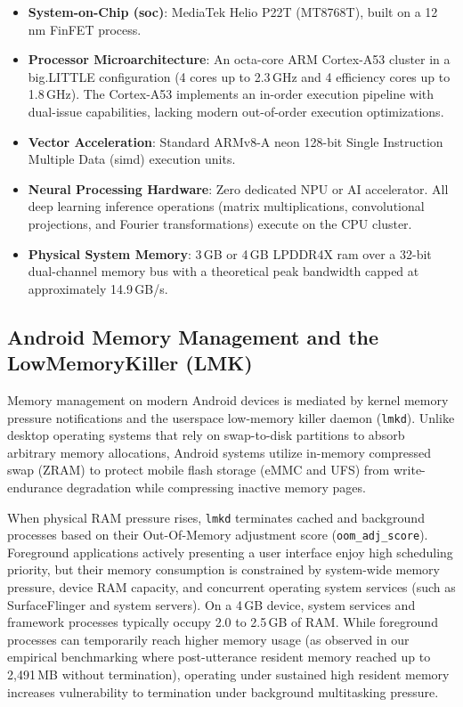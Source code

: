 \begin{itemize}
    \item \textbf{System-on-Chip (\acrshort{soc})}: MediaTek Helio P22T (MT8768T), built on a 12\,nm FinFET process.
    \item \textbf{Processor Microarchitecture}: An octa-core ARM Cortex-A53 cluster in a big.LITTLE configuration (4 cores up to 2.3\,GHz and 4 efficiency cores up to 1.8\,GHz). The Cortex-A53 implements an in-order execution pipeline with dual-issue capabilities, lacking modern out-of-order execution optimizations.
    \item \textbf{Vector Acceleration}: Standard ARMv8-A \acrshort{neon} 128-bit Single Instruction Multiple Data (\acrshort{simd}) execution units.
    \item \textbf{Neural Processing Hardware}: Zero dedicated NPU or AI accelerator. All deep learning inference operations (matrix multiplications, convolutional projections, and Fourier transformations) execute on the CPU cluster.
    \item \textbf{Physical System Memory}: 3\,GB or 4\,GB LPDDR4X \acrshort{ram} over a 32-bit dual-channel memory bus with a theoretical peak bandwidth capped at approximately 14.9\,GB/s.
\end{itemize}

\subsection{Android Memory Management and the LowMemoryKiller (LMK)}
Memory management on modern Android devices is mediated by kernel memory pressure notifications and the userspace low-memory killer daemon (\texttt{lmkd}). Unlike desktop operating systems that rely on swap-to-disk partitions to absorb arbitrary memory allocations, Android systems utilize in-memory compressed swap (ZRAM) to protect mobile flash storage (eMMC and UFS) from write-endurance degradation while compressing inactive memory pages.

When physical RAM pressure rises, \texttt{lmkd} terminates cached and background processes based on their Out-Of-Memory adjustment score (\texttt{oom\_adj\_score}). Foreground applications actively presenting a user interface enjoy high scheduling priority, but their memory consumption is constrained by system-wide memory pressure, device RAM capacity, and concurrent operating system services (such as SurfaceFlinger and system servers). On a 4\,GB device, system services and framework processes typically occupy 2.0 to 2.5\,GB of RAM. While foreground processes can temporarily reach higher memory usage (as observed in our empirical benchmarking where post-utterance resident memory reached up to 2,491\,MB without termination), operating under sustained high resident memory increases vulnerability to termination under background multitasking pressure. 

